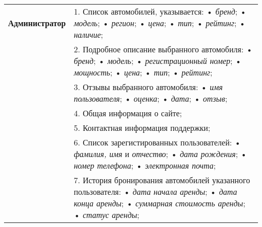 \begin{longtable}{|p{0.5cm}|p{15.5cm}|}
	\begin{rotatebox}[origin=r]{90}
		{ \textbf{Администратор}}
	\end{rotatebox} 
	& 
	1. Список автомобилей, указывается: \newline
	• \textit{бренд}; \newline
	• \textit{модель}; \newline
	• \textit{регион}; \newline
	• \textit{цена}; \newline
	• \textit{тип}; \newline
	• \textit{рейтинг}; \newline
	• \textit{наличие}; \\
	\cline{2-2}
	
	&
	2. Подробное описание выбранного автомобиля: \newline
	• \textit{бренд}; \newline
	• \textit{модель}; \newline
	• \textit{регистрационный номер}; \newline
	• \textit{мощность}; \newline
	• \textit{цена}; \newline
	• \textit{тип}; \newline
	• \textit{рейтинг}; \\
	\cline{2-2}
	
	&
	3. Отзывы выбранного автомобиля: \newline
	• \textit{имя пользователя}; \newline
	• \textit{оценка}; \newline
	• \textit{дата}; \newline
	• \textit{отзыв}; \\
	\cline{2-2}
	
	&
	4. Общая информация о сайте; \\
	\cline{2-2}
	
	&
	5. Контактная информация поддержки; \\
	\cline{2-2}
	
	&
	6. Список зарегистированных пользователей:
	• \textit{фамилия, имя} и \textit{отчество}; \newline
	• \textit{дата рождения}; \newline
	• \textit{номер телефона}; \newline
	• \textit{электронная почта}; \\
	\cline{2-2}
	
	&
	7. История бронирования автомобилей указанного пользователя:
	• \textit{дата начала аренды}; \newline
	• \textit{дата конца аренды}; \newline
	• \textit{суммарная стоимость аренды}; \newline
	• \textit{статус аренды}; \\
	\cline{2-2}
	

\end{longtable}

